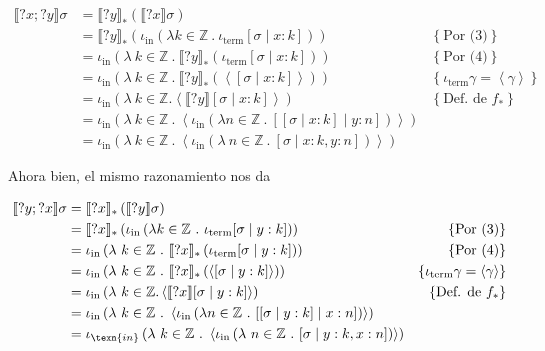\documentclass[article, 12pt]{article}
\begin{document}
\begin{align*}
  \llbracket ?x;?y \rrbracket\sigma 
  &= \llbracket ?y \rrbracket_* \left( \llbracket ?x \rrbracket \sigma \right)
  \\ 
  &=\llbracket ?y \rrbracket_* \left( \iota_{\text{in}}\left( \lambda k \in
\mathbb{Z} ~.~ \iota_{\text{term}}[\sigma \mid x : k] \right)  \right) &\left\{
\text{Por (3)}\right\}  \\ 
  &=\iota_{\text{in}} \left( \lambda ~ k \in \mathbb{Z} ~.~ \llbracket ?y
\rrbracket_*\left( \iota_{\text{term}} [\sigma \mid x : k] \right) \right)
  &\left\{ \text{Por (4)} \right\} \\ 
  &=\iota_{\text{in}} \left( \lambda ~ k \in \mathbb{Z} ~.~ \llbracket ?y
\rrbracket_* \left( \left< [\sigma \mid x : k] \right> \right) \right) &\left\{
\iota_{\text{term}}\gamma = \left<\gamma \right>\right\} \\ 
  &=\iota_{\text{in}} \left( \lambda ~ k \in \mathbb{Z}. 
\left<\llbracket ?y \rrbracket[\sigma \mid x : k] \right>\right) &\left\{
\text{Def. de } f_* \right\}  \\ 
&=\iota_{\text{in}} \left( \lambda ~ k \in \mathbb{Z} ~.~ 
  \left< \iota_{\text{in}} \left(\lambda n \in
\mathbb{Z} ~.~ [[\sigma \mid x : k] \mid y : n] \right)\right> \right) \\ 
&=\iota_{\text{in}} \left( \lambda ~ k \in \mathbb{Z} ~.~ 
\left< \iota_\text{in} \left( \lambda ~ n \in \mathbb{Z} ~.~ [\sigma \mid x : k,
y : n] \right)  \right>\right) 
\end{align*}

Ahora bien, el mismo razonamiento nos da

\begin{align*}
  \llbracket ?y;?x \rrbracket\sigma 
  &= \llbracket ?x \rrbracket_* \left( \llbracket ?y \rrbracket \sigma \right)
  \\ 
  &=\llbracket ?x \rrbracket_* \left( \iota_{\text{in}}\left( \lambda k \in
\mathbb{Z} ~.~ \iota_{\text{term}}[\sigma \mid y : k] \right)  \right) &\left\{
\text{Por (3)}\right\}  \\ 
  &=\iota_{\text{in}} \left( \lambda ~ k \in \mathbb{Z} ~.~ \llbracket ?x
\rrbracket_*\left( \iota_{\text{term}} [\sigma \mid y : k] \right) \right)
  &\left\{ \text{Por (4)} \right\} \\ 
  &=\iota_{\text{in}} \left( \lambda ~ k \in \mathbb{Z} ~.~ \llbracket ?x
\rrbracket_* \left( \left< [\sigma \mid y : k] \right> \right) \right) &\left\{
\iota_{\text{term}}\gamma = \left<\gamma \right>\right\} \\ 
  &=\iota_{\text{in}} \left( \lambda ~ k \in \mathbb{Z}. 
\left<\llbracket ?x \rrbracket[\sigma \mid y : k] \right>\right) &\left\{
\text{Def. de } f_* \right\}  \\ 
&=\iota_{\text{in}} \left( \lambda ~ k \in \mathbb{Z} ~.~ 
  \left< \iota_{\text{in}} \left(\lambda n \in
\mathbb{Z} ~.~ [[\sigma \mid y : k] \mid x : n] \right)\right> \right) \\ 
&=\iota_{\texn{in}} \left( \lambda ~ k \in \mathbb{Z} ~.~ 
\left< \iota_\text{in} \left( \lambda ~ n \in \mathbb{Z} ~.~ [\sigma \mid y : k,
x : n] \right)  \right>\right) 
\end{align*}
\end{document}
